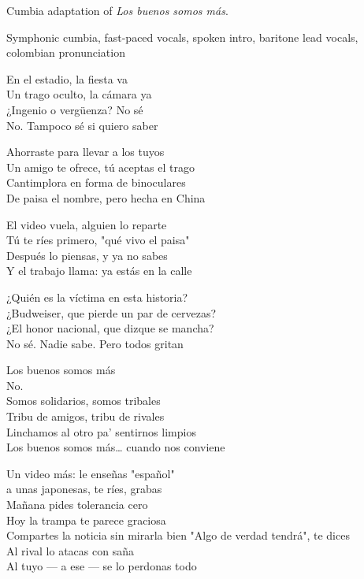 
\begin{notes}
Cumbia adaptation of \emph{Los buenos somos más}.
\end{notes}
\begin{style}
Symphonic cumbia, fast-paced vocals, spoken intro, baritone lead vocals, colombian pronunciation
\end{style}
\begin{lyrics}
En el estadio, la fiesta va\\
Un trago oculto, la cámara ya\\
¿Ingenio o vergüenza? No sé\\
No. Tampoco sé si quiero saber

Ahorraste para llevar a los tuyos\\
Un amigo te ofrece, tú aceptas el trago\\
Cantimplora en forma de binoculares\\
De paisa el nombre, pero hecha en China

El video vuela, alguien lo reparte\\
Tú te ríes primero, "qué vivo el paisa"\\
Después lo piensas, y ya no sabes\\
Y el trabajo llama: ya estás en la calle

¿Quién es la víctima en esta historia?\\
¿Budweiser, que pierde un par de cervezas?\\
¿El honor nacional, que dizque se mancha?\\
No sé. Nadie sabe. Pero todos gritan

Los buenos somos más\\
No.\\
Somos solidarios, somos tribales\\
Tribu de amigos, tribu de rivales\\
Linchamos al otro pa' sentirnos limpios\\
Los buenos somos más… cuando nos conviene

Un video más: le enseñas "español"\\
a unas japonesas, te ríes, grabas\\
Mañana pides tolerancia cero\\
Hoy la trampa te parece graciosa\\
Compartes la noticia sin mirarla bien
"Algo de verdad tendrá", te dices\\
Al rival lo atacas con saña\\
Al tuyo — a ese — se lo perdonas todo


\end{lyrics}
